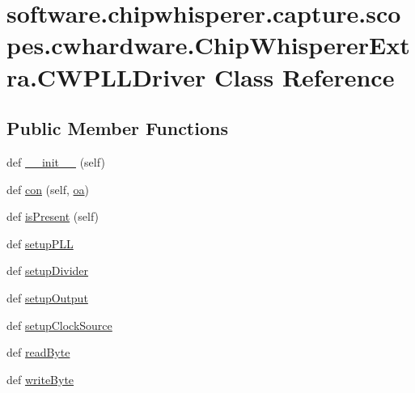 \hypertarget{classsoftware_1_1chipwhisperer_1_1capture_1_1scopes_1_1cwhardware_1_1ChipWhispererExtra_1_1CWPLLDriver}{}\section{software.\+chipwhisperer.\+capture.\+scopes.\+cwhardware.\+Chip\+Whisperer\+Extra.\+C\+W\+P\+L\+L\+Driver Class Reference}
\label{classsoftware_1_1chipwhisperer_1_1capture_1_1scopes_1_1cwhardware_1_1ChipWhispererExtra_1_1CWPLLDriver}
\subsection*{Public Member Functions}
\begin{DoxyCompactItemize}
\item 
def \hyperlink{classsoftware_1_1chipwhisperer_1_1capture_1_1scopes_1_1cwhardware_1_1ChipWhispererExtra_1_1CWPLLDriver_a977b10d25cdac88d0425144b55297430}{\+\_\+\+\_\+init\+\_\+\+\_\+} (self)
\item 
def \hyperlink{classsoftware_1_1chipwhisperer_1_1capture_1_1scopes_1_1cwhardware_1_1ChipWhispererExtra_1_1CWPLLDriver_af879dc02c87a05b98bbb212d8289ec68}{con} (self, \hyperlink{classsoftware_1_1chipwhisperer_1_1capture_1_1scopes_1_1cwhardware_1_1ChipWhispererExtra_1_1CWPLLDriver_a650f1d358411a7a3cc68cac107516d19}{oa})
\item 
def \hyperlink{classsoftware_1_1chipwhisperer_1_1capture_1_1scopes_1_1cwhardware_1_1ChipWhispererExtra_1_1CWPLLDriver_a95f7ffcb9965893aa4e30add20ff44fb}{is\+Present} (self)
\item 
def \hyperlink{classsoftware_1_1chipwhisperer_1_1capture_1_1scopes_1_1cwhardware_1_1ChipWhispererExtra_1_1CWPLLDriver_ab286c0d4f8f5e33e2baef8363a9a9d5a}{setup\+P\+L\+L}
\item 
def \hyperlink{classsoftware_1_1chipwhisperer_1_1capture_1_1scopes_1_1cwhardware_1_1ChipWhispererExtra_1_1CWPLLDriver_a9abee132d9aaad0d77931fd33203cea4}{setup\+Divider}
\item 
def \hyperlink{classsoftware_1_1chipwhisperer_1_1capture_1_1scopes_1_1cwhardware_1_1ChipWhispererExtra_1_1CWPLLDriver_a3b51a4671e4fa615bb99ac6e6d6c63a6}{setup\+Output}
\item 
def \hyperlink{classsoftware_1_1chipwhisperer_1_1capture_1_1scopes_1_1cwhardware_1_1ChipWhispererExtra_1_1CWPLLDriver_a502489ab4d7db664da2f705bb0a13531}{setup\+Clock\+Source}
\item 
def \hyperlink{classsoftware_1_1chipwhisperer_1_1capture_1_1scopes_1_1cwhardware_1_1ChipWhispererExtra_1_1CWPLLDriver_a514e8d1fb6a2d18f5c41424c9eb188bd}{read\+Byte}
\item 
def \hyperlink{classsoftware_1_1chipwhisperer_1_1capture_1_1scopes_1_1cwhardware_1_1ChipWhispererExtra_1_1CWPLLDriver_a6f32ff51655976a7aa684748e77a6a93}{write\+Byte}
\end{DoxyCompactItemize}
